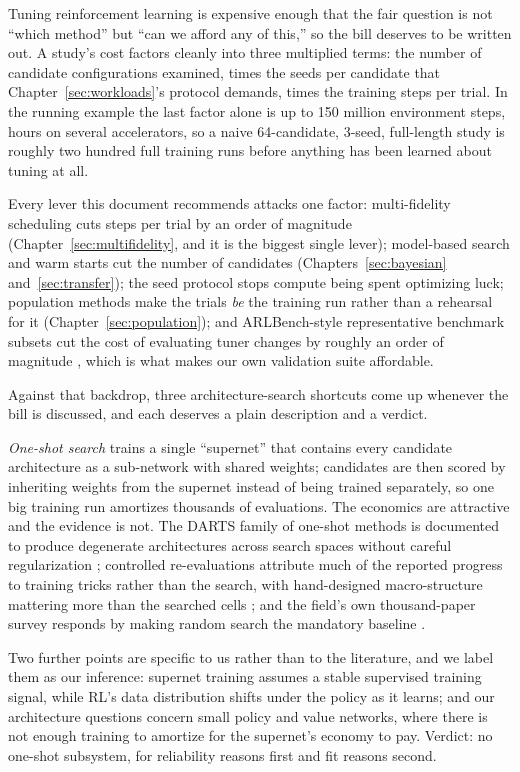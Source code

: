 Tuning reinforcement learning is expensive enough that the fair question
is not ``which method'' but ``can we afford any of this,'' so the bill
deserves to be written out. A study's cost factors cleanly into three
multiplied terms: the number of candidate configurations examined, times
the seeds per candidate that Chapter~\ref{sec:workloads}'s protocol
demands, times the training steps per trial. In the running example the
last factor alone is up to 150 million environment steps, hours on
several accelerators, so a naive 64-candidate, 3-seed, full-length study
is roughly two hundred full training runs before anything has been
learned about tuning at all.

Every lever this document recommends
attacks one factor: multi-fidelity scheduling cuts steps per trial by
an order of magnitude (Chapter~\ref{sec:multifidelity}, and it is the
biggest single lever); model-based search and warm starts cut the
number of candidates (Chapters~\ref{sec:bayesian}
and~\ref{sec:transfer}); the seed protocol stops compute being spent
optimizing luck; population methods make the trials \emph{be} the
training run rather than a rehearsal for it
(Chapter~\ref{sec:population}); and ARLBench-style representative
benchmark subsets cut the cost of evaluating tuner changes by roughly
an order of magnitude \citep{becktepe2024arlbench}, which is what makes
our own validation suite affordable.

Against that backdrop, three architecture-search shortcuts come up
whenever the bill is discussed, and each deserves a plain description
and a verdict.

\emph{One-shot search} trains a single ``supernet'' that contains every
candidate architecture as a sub-network with shared weights; candidates
are then scored by inheriting weights from the supernet instead of being
trained separately, so one big training run amortizes thousands of
evaluations. The economics are attractive and the evidence is not. The
DARTS family of one-shot methods is documented to produce degenerate
architectures across search spaces without careful regularization
\citep{zela2020robustifying}; controlled re-evaluations attribute much
of the reported progress to training tricks rather than the search, with
hand-designed macro-structure mattering more than the searched cells
\citep{yang2020frustratingly}; and the field's own thousand-paper survey
responds by making random search the mandatory baseline
\citep{white2023nas1000}.

Two further points are specific to us rather
than to the literature, and we label them as our inference: supernet
training assumes a stable supervised training signal, while RL's data
distribution shifts under the policy as it learns; and our architecture
questions concern small policy and value networks, where there is not
enough training to amortize for the supernet's economy to pay. Verdict:
no one-shot subsystem, for reliability reasons first and fit reasons
second.

